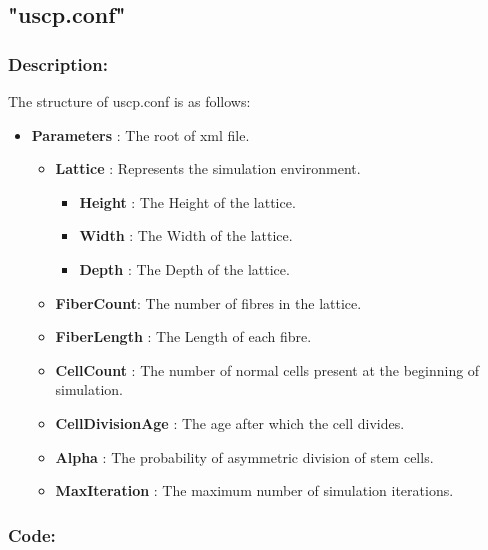 \documentclass[11pt]{report}
\begin{document}
  \subsection{\color{blue}"uscp.conf"}
  \subsubsection{\color{green}Description: }
  The structure of uscp.conf is as follows:
  \begin{itemize}
   \item \textbf{Parameters} : The root of xml file.
   \begin{itemize}
    \item \textbf{Lattice} : Represents the simulation environment.
    \begin{itemize}
     \item \textbf{Height} : The Height of the lattice.
     \item \textbf{Width} : The Width of the lattice.
     \item \textbf{Depth} : The Depth of the lattice.
    \end{itemize}

    \item \textbf{FiberCount}: The number of fibres in the lattice.
    \item \textbf{FiberLength} : The Length of each fibre.
    \item \textbf{CellCount} : The number of normal cells present at the beginning of simulation.
    \item \textbf{CellDivisionAge} : The age after which the cell divides.
    \item \textbf{Alpha} : The probability of asymmetric division of stem cells.
    \item \textbf{MaxIteration} : The maximum number of simulation iterations.

   \end{itemize}

  \end{itemize}
  
  \subsubsection{\color{green}Code: }
  \lstset{language=XML}
  


  
 
 
\end{document}
